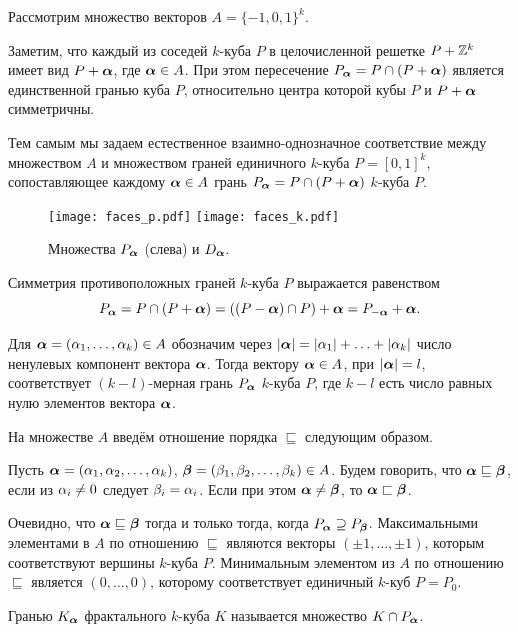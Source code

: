 Рассмотрим множество векторов $A=\{-1,0,1\}^k$.

Заметим, что каждый из соседей $k$-куба $P$ в целочисленной решетке $P+\mathbb{Z}^k$ имеет вид $P+{\bm{\alpha}}$, где ${\bm{\alpha}}\in A$. При этом пересечение $P_{\bm{\alpha}}=P\cap(P+{\bm{\alpha}})$ является единственной гранью куба $P$, относительно центра которой кубы $P$ и $P+{\bm{\alpha}}$ симметричны. 

Тем самым мы задаем  естественное  взаимно-однозначное соответствие
между множеством $A$ и множеством граней единичного $k$-куба $P=[0,1]^k$, сопоставляющее каждому ${\bm{\alpha}}\in A$ грань 
$P_{\bm{\alpha}}=P\cap(P+{\bm{\alpha}})$ $k$-куба $P$.

\begin{figure}[h!]
 \centering
 \texttt{[image: faces\_p.pdf]}
 \hfill
 \texttt{[image: faces\_k.pdf]}
 \caption{Множества $P_{\bm{\alpha}}$ (слева) и $D_{\bm{\alpha}}.$}
 \label{fig:faces}
\end{figure}


Симметрия противоположных граней $k$-куба $P$ выражается равенством 
$$P_{\bm{\alpha}}=P\cap(P+{\bm{\alpha}})=((P-{\bm{\alpha}})\cap P)+{\bm{\alpha}}=P_{-{\bm{\alpha}}}+{\bm{\alpha}}.$$

Для ${\bm{\alpha}}=(\alpha_1,\ldots,\alpha_k)\in A$  обозначим через $|{\bm{\alpha}}|=|\alpha_1|+\ldots+|\alpha_k|$ число ненулевых компонент вектора ${\bm{\alpha}}$.
Тогда вектору ${\bm{\alpha}}\in A$, при $|{\bm{\alpha}}|=l$, соответствует $(k-l)$-мерная грань $P_{\bm{\alpha}}$ $k$-куба $P$, где $k-l$ есть число равных нулю элементов вектора ${\bm{\alpha}}$.



На множестве $A$ введём отношение порядка $\sqsubseteq$ следующим образом.

\begin{definition}\label{Aorder}
Пусть ${\bm{\alpha}}=(\alpha_1,\alpha_2,\ldots,\alpha_k)$, ${\bm{\beta}}=(\beta_1,\beta_2,\ldots,\beta_k)\in A$.
Будем говорить, что ${\bm{\alpha}}\sqsubseteq{\bm{\beta}}$, если из $\alpha_i\neq 0$ следует $\beta_i=\alpha_i$.
Если при этом ${\bm{\alpha}}\neq{\bm{\beta}}$, то ${\bm{\alpha}}\sqsubset{\bm{\beta}}$.
\end{definition}

Очевидно, что ${\bm{\alpha}}\sqsubseteq{\bm{\beta}}$ тогда и только тогда, когда $P_{\bm{\alpha}}\supseteq P_{\bm{\beta}}$. 
Максимальными элементами в $A$ по отношению $\sqsubseteq$ являются векторы $(\pm 1,\ldots,\pm 1)$, которым соответствуют вершины $k$-куба $P$.
Минимальным элементом из $A$ по отношению $\sqsubseteq$ является $(0, \ldots, 0)$, которому соответствует единичный $k$-куб $P=P_{0}$.

\begin{definition}\label{def:K_alpha}
Гранью $K_{\bm{\alpha}}$ фрактального $k$-куба $K$ называется множество $K\cap P_{\bm{\alpha}}$.
\end{definition}

